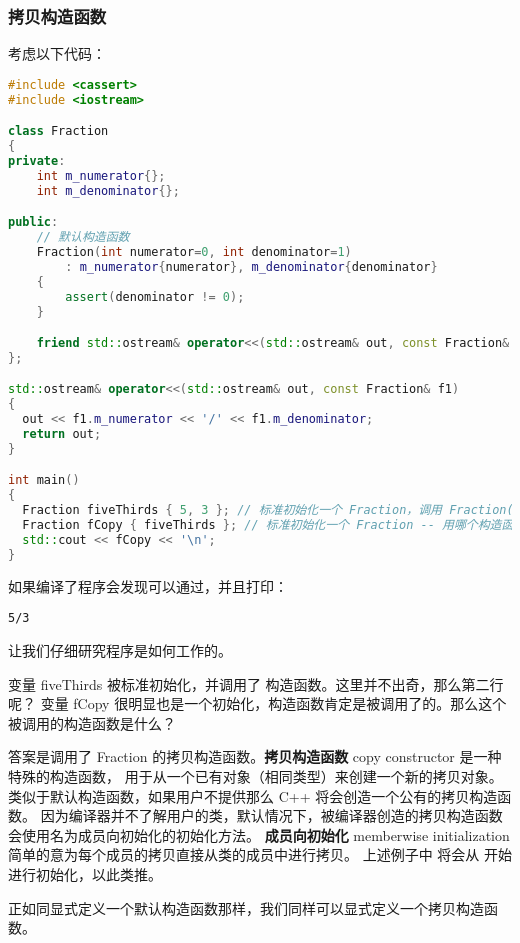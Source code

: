 \documentclass[../../LearnCpp.tex]{subfiles}
\begin{document}
\subsubsection*{拷贝构造函数}

考虑以下代码：

\begin{lstlisting}[language=C++]
#include <cassert>
#include <iostream>

class Fraction
{
private:
    int m_numerator{};
    int m_denominator{};

public:
    // 默认构造函数
    Fraction(int numerator=0, int denominator=1)
        : m_numerator{numerator}, m_denominator{denominator}
    {
        assert(denominator != 0);
    }

    friend std::ostream& operator<<(std::ostream& out, const Fraction& f1);
};

std::ostream& operator<<(std::ostream& out, const Fraction& f1)
{
  out << f1.m_numerator << '/' << f1.m_denominator;
  return out;
}

int main()
{
  Fraction fiveThirds { 5, 3 }; // 标准初始化一个 Fraction，调用 Fraction(int, int) 构造函数
  Fraction fCopy { fiveThirds }; // 标准初始化一个 Fraction -- 用哪个构造函数？
  std::cout << fCopy << '\n';
}
\end{lstlisting}

如果编译了程序会发现可以通过，并且打印：

\begin{lstlisting}
5/3
\end{lstlisting}

让我们仔细研究程序是如何工作的。

变量 fiveThirds 被标准初始化，并调用了  构造函数。这里并不出奇，那么第二行呢？
变量 fCopy 很明显也是一个初始化，构造函数肯定是被调用了的。那么这个被调用的构造函数是什么？

答案是调用了 Fraction 的拷贝构造函数。\textbf{拷贝构造函数} copy constructor 是一种特殊的构造函数，
用于从一个已有对象（相同类型）来创建一个新的拷贝对象。类似于默认构造函数，如果用户不提供那么 C++ 将会创造一个公有的拷贝构造函数。
因为编译器并不了解用户的类，默认情况下，被编译器创造的拷贝构造函数会使用名为成员向初始化的初始化方法。
\textbf{成员向初始化} memberwise initialization 简单的意为每个成员的拷贝直接从类的成员中进行拷贝。
上述例子中  将会从  开始进行初始化，以此类推。

正如同显式定义一个默认构造函数那样，我们同样可以显式定义一个拷贝构造函数。
\end{document}
